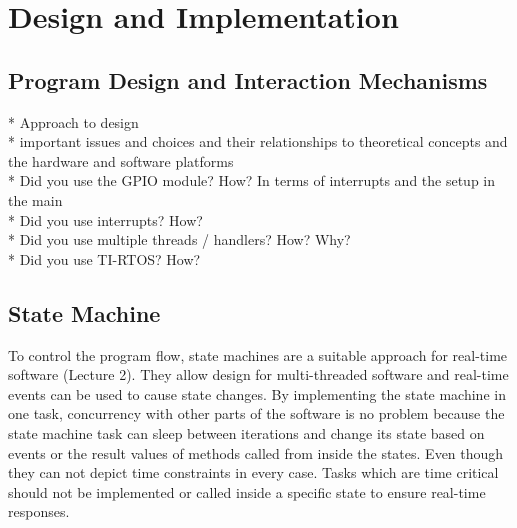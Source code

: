 \chapter{Design and Implementation} %

\section{Program Design and Interaction Mechanisms} %
* Approach to design\\
* important issues and choices and their relationships to theoretical concepts and the hardware and software platforms\\
* Did you use the GPIO module? How? In terms of interrupts and the setup in the main\\
* Did you use interrupts? How?\\ 
* Did you use multiple threads / handlers? How? Why?\\
* Did you use TI-RTOS? How?\\

\section{State Machine} \label{sec:statemachine}%
To control the program flow, state machines are a suitable approach for real-time software (Lecture 2). They allow design for multi-threaded software and real-time events can be used to cause state changes. By implementing the state machine in one task, concurrency with other parts of the software is no problem because the state machine task can sleep between iterations and change its state based on events or the result values of methods called from inside the states. Even though they can not depict time constraints in every case. Tasks which are time critical should not be implemented or called inside a specific state to ensure real-time responses.

